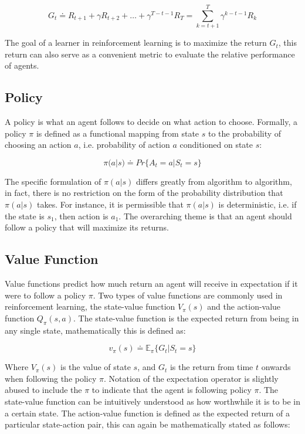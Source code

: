 \documentclass[../report.tex]{subfiles}
\begin{document}
\begin{equation}\label{eq:return}
    G_t \doteq R_{t+1} + \gamma R_{t+2} + \dots + \gamma^{T-t-1}R_T = \sum\limits_{k=t+1}^T \gamma^{k-t-1} R_k
\end{equation}

The goal of a learner in reinforcement learning is to maximize the return $G_t$, this return can also serve as a convenient metric to evaluate the relative performance of agents.

\subsection{Policy}

A policy is what an agent follows to decide on what action to choose. Formally, a policy $\pi$ is defined as a functional mapping from state $s$ to the probability of choosing an action $a$, i.e. probability of action $a$ conditioned on state $s$:

\begin{equation}
    \pi(a|s) \doteq Pr\{A_t=a | S_t=s\}
\end{equation}

The specific formulation of $\pi(a|s)$ differs greatly from algorithm to algorithm, in fact, there is no restriction on the form of the probability distribution that $\pi(a|s)$ takes. For instance, it is permissible that $\pi(a|s)$ is deterministic, i.e. if the state is $s_1$, then action is $a_1$. The overarching theme is that an agent should follow a policy that will maximize its returns.

\subsection{Value Function}

Value functions predict how much return an agent will receive in expectation if it were to follow a policy $\pi$. Two types of value functions are commonly used in reinforcement learning, the state-value function $V_{\pi}(s)$ and the action-value function $Q_{\pi}(s, a)$. The state-value function is the expected return from being in any single state, mathematically this is defined as:

\begin{equation}\label{eq:state_value_function}
    v_{\pi}(s) \doteq \mathbb{E}_{\pi}\{G_t | S_t = s\}
\end{equation}

Where $V_{\pi}(s)$ is the value of state $s$, and $G_t$ is the return from time $t$ onwards when following the policy $\pi$. Notation of the expectation operator is slightly abused to include the $\pi$ to indicate that the agent is following policy $\pi$. The state-value function can be intuitively understood as how worthwhile it is to be in a certain state. The action-value function is defined as the expected return of a particular state-action pair, this can again be mathematically stated as follows:
\end{document}

